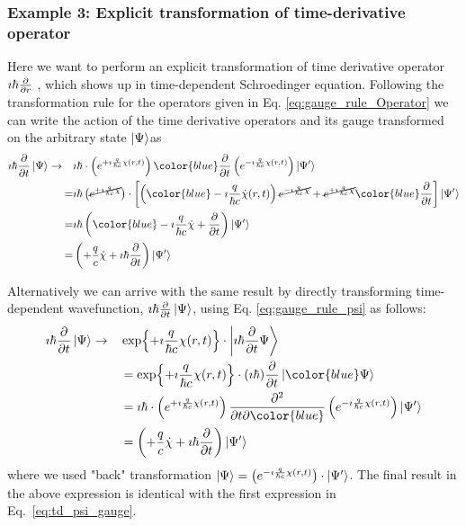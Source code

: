 \documentclass[11pt]{article}
\begin{document}
\subsubsection{Example 3: Explicit transformation of time-derivative operator}

Here we want to perform an explicit transformation of time derivative operator $\imath \hbar \pdv{}{r}$ , which shows up  in time-dependent  Schroedinger equation.
 Following the     transformation rule for the operators given in Eq. \ref{eq:gauge_rule_Operator} we can write  the action of the time derivative operators and its gauge transformed  on the arbitrary state  $\ket{\Psi}$as 
\begin{align}
 \label{eq:td_psi_gauge}  \imath \hbar \pdv{}{t} \ket{\Psi} \to \quad&
       \imath \hbar \cdot  \left( e^{+\imath \frac{q}{\hbar c} \chi(r,t)} \right) {\color{blue} \pdv{}{t} } \left( e^{-\imath \frac{q}{\hbar c} \chi(r,t)}  \right)  \ket{\Psi'}\\ \nonumber
=& \imath \hbar\left( \cancel{ e^{+\imath \frac{q}{\hbar c} \chi }} \right) \cdot
       \left[ \left({\color{blue} -\imath \frac{q}{\hbar c} \dot \chi(r,t)  }\right) \cancel{ e^{-\imath \frac{q}{\hbar c} \chi}}  + \cancel{e^{+\imath \frac{q}{\hbar c} \chi}} {\color{blue} \pdv{}{t} }  \right] \ket{\Psi'} \\ \nonumber
=& \imath \hbar\left({\color{blue} -\imath \frac{q}{\hbar c} \dot \chi +\pdv{}{t} }   \right) \ket{\Psi'}  \\ \nonumber 
=& \left( +\frac{q}{c} \dot \chi + \imath \hbar \pdv{}{t} \right) \ket{ \Psi'}
\end{align}

Alternatively we can arrive with the same result by directly transforming  time-dependent wavefunction, $\imath \hbar\pdv{}{t}\ket{\Psi}$, using Eq. \ref{eq:gauge_rule_psi} as follows:
\begin{align*}
   \imath \hbar \pdv{}{t} \ket{\Psi} \to \quad&
 \exp{+\imath \frac{q}{\hbar c} \chi(r,t)}  \cdot \ket{ \imath \hbar \pdv{}{t} \Psi }  \\ 
 & =\exp{+\imath \frac{q}{\hbar c} \chi(r,t)} \cdot (\imath \hbar) \pdv{}{t} \ket{\color{blue}\Psi} 
\\&  =  %
       \imath \hbar \cdot  \left( e^{+\imath \frac{q}{\hbar c} \chi(r,t)} \right)  \pdv{}{t}  \color{blue}  \left( e^{-\imath \frac{q}{\hbar c} \chi(r,t)}  \right)  \ket{\Psi'}\\
&= \left( +\frac{q}{c} \dot \chi + \imath \hbar \pdv{}{t} \right) \ket{ \Psi'}      
\end{align*}   
where we used "back" transformation $\ket{\Psi}=\left( e^{-\imath \frac{q}{\hbar c} \chi(r,t)}  \right) \cdot \ket{\Psi'}$.
The final result in the above expression is identical with the first expression in   Eq.~\ref{eq:td_psi_gauge}.
\end{document}
